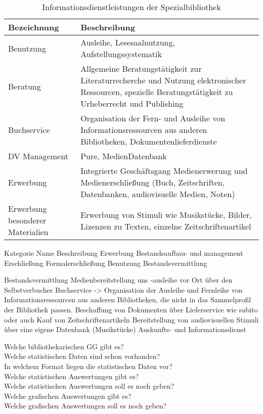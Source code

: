 {\begin{table}[h]
    \centering
    \begin{adjustbox}{max width=\textwidth}
    \begin{tabular}{ll}
       \toprule
       \textbf{Bezeichnung}& \textbf{Beschreibung}\\
       \midrule
        Benutzung   &Ausleihe, Lesesaalnutzung, Aufstellungssystematik\\
        Beratung    &Allgemeine Beratungstätigkeit zur Literaturrecherche und Nutzung elektronischer Ressourcen, spezielle Beratungstätigkeit zu Urheberrecht und Publishing\\
        Buchservice &Organisation der Fern- und Ausleihe von Informationsressourcen aus anderen Bibliotheken, Dokumentenlieferdienste\\
        DV Management   &Pure, MedienDatenbank\\
        Erwerbung                           &Integrierte Geschäftsgang Medienerwerung und Medienerschließung (Buch, Zeitschriften, Datenbanken, audiovisuelle Medien, Noten)\\
        Erwerbung besonderer Materialien    &Erwerbung von Stimuli wie Musikstücke, Bilder, Lizenzen zu Texten, einzelne Zeitschriftenartikel\\
         
       \bottomrule
    \end{tabular}
    \end{adjustbox}
    \caption{%
        Informationsdienstleistungen der Spezialbibliothek
    }
    \label{tab:Informationsdienstleistungen}
    \end{table}

Kategorie           Name                                Beschreibung
Erwerbung           Bestandsaufbau- und management
Erschließung        Formalerschließung
Benutzung           Bestandsvermittlung


Bestandsvermittlung Medienbereitstellung uns -ausleihe vor Ort über den Selbstverbucher
Buchservice -> Organisation der Ausleihe und Fernleihe von Informationsressourcen aus anderen Bibliotheken, die nicht in das Sammelprofil der Bibliothek passen. 
    Beschaffung von Dokumenten über Lieferservice wie subito
    oder auch Kauf von Zeitschriftenartikeln
Bereitstellung von audiovisuellen Stimuli über eine eigene Datenbank (Musikstücke)
Auskunfts- und Informationsdienst



Welche bibliothekarischen GG gibt es?\\
Welche statistischen Daten sind schon vorhanden?\\
In welchem Format liegen die statistischen Daten vor?\\
Welche statistischen Auswertungen gibt es?\\
Welche statistischen Auswertungen soll es noch geben?\\
Welche grafischen Auswertungen gibt es?\\
Welche grafischen Auswertungen soll es noch geben?

}
